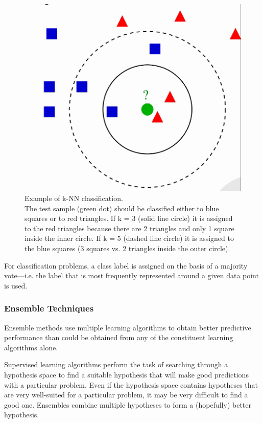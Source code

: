         \begin{figure}
            \centering
            \includegraphics[width=0.75\linewidth]{graphics//chapter3/knn.png}
            \caption[Example of k-NN classification]{Example of k-NN classification. \\The test sample (green dot) should be classified either to blue squares or to red triangles. If k = 3 (solid line circle) it is assigned to the red triangles because there are 2 triangles and only 1 square inside the inner circle. If k = 5 (dashed line circle) it is assigned to the blue squares (3 squares vs. 2 triangles inside the outer circle)\cite{knn-credit}.}
            \label{fig:knn}
        \end{figure}
        
        For classification problems, a class label is assigned on the basis of a majority vote—i.e. the label that is most frequently represented around a given data point is used.
        
        \subsubsection{Ensemble Techniques}
        Ensemble methods use multiple learning algorithms to obtain better predictive performance than could be obtained from any of the constituent learning algorithms alone\cite{em}.\par\vspace{1em}
        
        Supervised learning algorithms perform the task of searching through a hypothesis space to find a suitable hypothesis that will make good predictions with a particular problem. Even if the hypothesis space contains hypotheses that are very well-suited for a particular problem, it may be very difficult to find a good one. Ensembles combine multiple hypotheses to form a (hopefully) better hypothesis. \par\vspace{1em}
        
